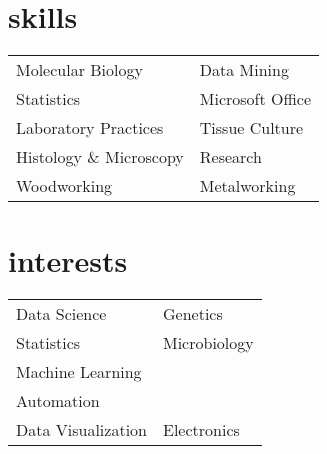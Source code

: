 \documentclass[10pt]{article}
\begin{document}
\begin{minipage}[ht]{.25\linewidth}
   \section*{skills}
   \flushright
   {\footnotesize
      \begin{tabularx}{\linewidth}{p{.44\linewidth}X}
         Molecular \newline Biology & Data Mining \\
         Statistics & Microsoft Office \\
         Laboratory \newline Practices & Tissue Culture \\
         Histology \& \newline Microscopy & Research \\
         Woodworking & Metalworking \\
      \end{tabularx}
   }
   \flushleft
   \section*{interests}
   \flushright
   {\footnotesize
      \begin{tabularx}{\linewidth}{p{.5\linewidth}p{.5\linewidth}}
         Data Science & Genetics \\
         Statistics & Microbiology \\
         Machine Learning & \\
         Automation & \\
         Data Visualization & Electronics \\
      \end{tabularx}
   }
   \flushleft
   \section*{}
\end{minipage}
\end{document}
